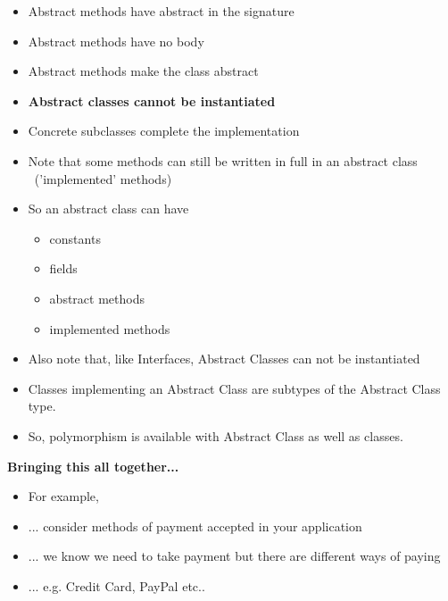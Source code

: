 \documentclass{beamer}
\begin{document}
\begin{frame}
\begin{itemize}
\item Abstract methods have abstract in the signature
\item Abstract methods have no body
\item Abstract methods make the class abstract
\item \textbf{Abstract classes cannot be instantiated}
\item Concrete subclasses complete the implementation
\end{itemize}
\end{frame}

\begin{frame}
\begin{itemize}
\item Note that some methods can still be written in full in an abstract class \ ('implemented{}' methods)
\bigskip
\item So an abstract class can have 
\begin{itemize}
\item constants
\item fields
\item abstract methods
\item implemented methods
\end{itemize}
\end{itemize}
\end{frame}

\begin{frame}
\begin{itemize}
\item Also note that, like Interfaces, Abstract Classes can not be instantiated
\item Classes implementing an Abstract Class are subtypes of the Abstract Class type.
\item So, polymorphism is available with Abstract Class as well as classes.
\end{itemize}
\end{frame}

\begin{frame}
\begin{center}
\textbf{Bringing this all together...}
\end{center}
\begin{itemize}
\item For example, 
\bigskip
\item ... consider methods of payment accepted in your application
\item ... we know we need to take payment but there are different ways of paying
\item ... e.g. Credit Card, PayPal etc..
\end{itemize}
\end{frame}
\end{document}
